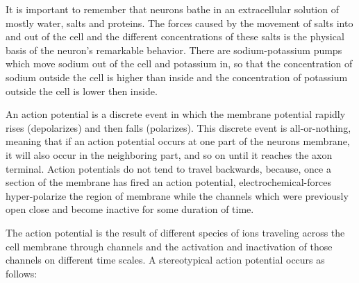 \documentclass[paper=a4, fontsize=11pt]{scrartcl} %
\numberwithin{equation}{section} %
\numberwithin{figure}{section} %
\numberwithin{table}{section} %
\begin{document}
\vspace{10pt}
It is important to remember that neurons bathe in an extracellular solution of mostly water, salts and proteins. The forces caused by the movement of salts into and out of the cell and the different concentrations of these salts is the physical basis of the neuron’s remarkable behavior. There are sodium-potassium pumps which move sodium out of the cell and potassium in, so that the concentration of sodium outside the cell is higher than inside and the concentration of potassium outside the cell is lower then inside.

\vspace{10pt}
An action potential is a discrete event in which the membrane potential rapidly rises (depolarizes) and then falls (polarizes). This discrete event is all-or-nothing, meaning that if an action potential occurs at one part of the neurons membrane, it will also occur in the neighboring part, and so on until it reaches the axon terminal. Action potentials do not tend to travel backwards, because, once a section of the membrane has fired an action potential, electrochemical-forces hyper-polarize the region of membrane while the channels which were previously open close and become inactive for some duration of time.

\vspace{10pt}
The action potential is the result of different species of ions traveling across the cell membrane through channels and the activation and inactivation of those channels on different time scales. A stereotypical action potential occurs as follows:
\end{document}
